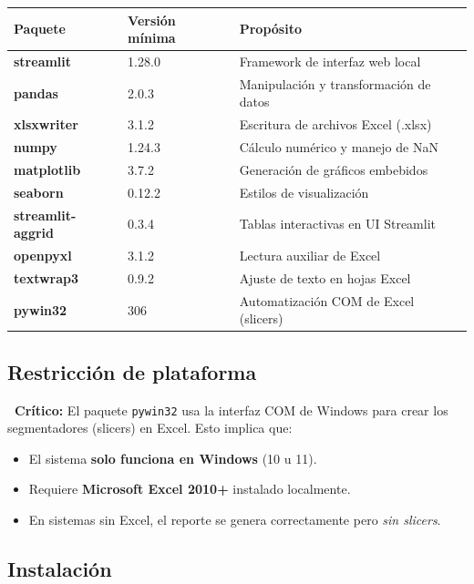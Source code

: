 \documentclass[12pt, letterpaper]{article}
\begin{document}
\begin{center}
\begin{tabular}{>{\ttfamily\bfseries}l l >{\small}l}
\toprule
\textbf{Paquete} & \textbf{Versión mínima} & \textbf{Propósito} \\
\midrule
streamlit         & 1.28.0  & Framework de interfaz web local \\
pandas            & 2.0.3   & Manipulación y transformación de datos \\
xlsxwriter        & 3.1.2   & Escritura de archivos Excel (.xlsx) \\
numpy             & 1.24.3  & Cálculo numérico y manejo de NaN \\
matplotlib        & 3.7.2   & Generación de gráficos embebidos \\
seaborn           & 0.12.2  & Estilos de visualización \\
streamlit-aggrid  & 0.3.4   & Tablas interactivas en UI Streamlit \\
openpyxl          & 3.1.2   & Lectura auxiliar de Excel \\
textwrap3         & 0.9.2   & Ajuste de texto en hojas Excel \\
pywin32           & 306     & Automatización COM de Excel (slicers) \\
\bottomrule
\end{tabular}
\end{center}

\subsection{Restricción de plataforma}

\begin{mdframed}[backgroundcolor=rojoclaro, linecolor=rojo, linewidth=1pt, roundcorner=4pt]
\textbf{\color{rojo}\faExclamationTriangle\ Crítico:} El paquete \texttt{pywin32} usa la interfaz COM de Windows para crear los segmentadores (slicers) en Excel. Esto implica que:
\begin{itemize}
  \item El sistema \textbf{solo funciona en Windows} (10 u 11).
  \item Requiere \textbf{Microsoft Excel 2010+} instalado localmente.
  \item En sistemas sin Excel, el reporte se genera correctamente pero \emph{sin slicers}.
\end{itemize}
\end{mdframed}

\subsection{Instalación}
\end{document}
